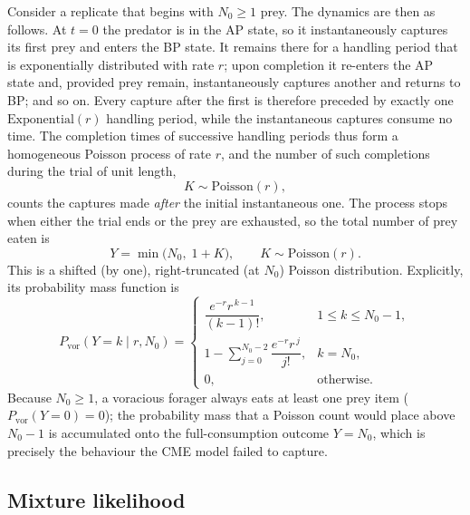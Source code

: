 Consider a replicate that begins with $N_0 \geq 1$ prey. The dynamics are then as follows. At $t = 0$ the predator is in the AP state, so it instantaneously captures its first prey and enters the BP state. It remains there for a handling period that is exponentially distributed with rate $r$; upon completion it re-enters the AP state and, provided prey remain, instantaneously captures another and returns to BP; and so on. Every capture after the first is therefore preceded by exactly one $\mathrm{Exponential}(r)$ handling period, while the instantaneous captures consume no time. The completion times of successive handling periods thus form a homogeneous Poisson process of rate $r$, and the number of such completions during the trial of unit length,
\[
K \sim \mathrm{Poisson}(r),
\]
counts the captures made \emph{after} the initial instantaneous one. The process stops when either the trial ends or the prey are exhausted, so the total number of prey eaten is
\begin{equation}
\label{eq:voracious-count}
Y = \min\!\big(N_0,\; 1 + K\big), \qquad K \sim \mathrm{Poisson}(r).
\end{equation}
This is a shifted (by one), right-truncated (at $N_0$) Poisson distribution. Explicitly, its probability mass function is
\begin{equation}
\label{eq:voracious-pmf}
P_{\mathrm{vor}}(Y = k \mid r, N_0) =
\begin{cases}
\dfrac{e^{-r} r^{\,k-1}}{(k-1)!}, & 1 \leq k \leq N_0 - 1, \\[2ex]
\displaystyle 1 - \sum_{j=0}^{N_0 - 2} \dfrac{e^{-r} r^{\,j}}{j!}, & k = N_0, \\[2ex]
0, & \text{otherwise.}
\end{cases}
\end{equation}
Because $N_0 \geq 1$, a voracious forager always eats at least one prey item ($P_{\mathrm{vor}}(Y = 0) = 0$); the probability mass that a Poisson count would place above $N_0 - 1$ is accumulated onto the full-consumption outcome $Y = N_0$, which is precisely the behaviour the CME model failed to capture.

\subsection*{Mixture likelihood}

